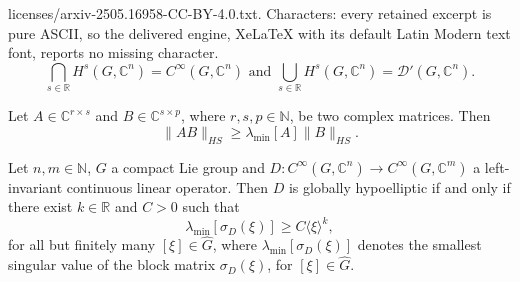 \documentclass[10pt,a4paper]{amsart}
\newcommand{\C}{\mathbb{C}}
\newcommand{\N}{\mathbb{N}}
\newcommand{\R}{\mathbb{R}}
\begin{document}
licenses/arxiv-2505.16958-CC-BY-4.0.txt. Characters: every retained excerpt is pure ASCII, so the delivered engine, XeLaTeX with its default Latin Modern text font, reports no missing character.
\begin{equation}\label{sobolev-cup-cap}
  \bigcap_{s\in\R} H^s(G,\C^n)=C^\infty(G,\C^n) \text{ and } \bigcup_{s\in\R} H^s(G,\C^n)=\mathcal{D}'(G,\C^n).  
\end{equation}

\begin{lemma}\label{lemmasingvalue}
Let $A\in\mathbb{C}^{r\times s}$ and $B\in\mathbb{C}^{s\times p}$, where $r,s,p\in\N$, be two complex matrices. Then 
\begin{equation*}\label{ineqsingularvalue}
        \|AB\|_{HS}\geq \lambda_{\min}[A]\|B\|_{HS}.
    \end{equation*}
\end{lemma}

\begin{theorem}\label{theo-vector}
    Let $n,m\in\N$, $G$ a compact Lie group and $D:C^\infty(G,\mathbb{C}^n)\to C^\infty(G,\mathbb{C}^m)$ a left-invariant continuous linear operator. Then $D$ is globally hypoelliptic if and only if there exist $k\in\R$ and $C>0$ such that
    \begin{equation}\label{ineq_theo}
        \lambda_{\min}[\sigma_D(\xi)]\geq C\langle\xi\rangle^k,
    \end{equation}
    for all but finitely many $[\xi]\in\widehat{G}$, where $\lambda_{\min}[\sigma_D(\xi)]$ denotes the smallest singular value of the block matrix $\sigma_D(\xi)$, for $[\xi]\in\widehat{G}$.
\end{theorem}
\end{document}

